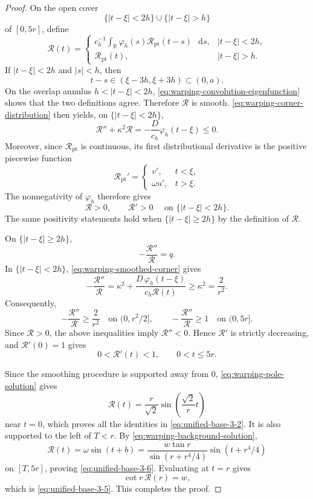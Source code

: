 \documentclass[11pt,reqno]{amsart}
\theoremstyle{definition}
\numberwithin{equation}{section}
\newcommand{\dd}{\mathop{}\!\mathrm d}
\begin{document}
\begin{proof}
On the open cover
\[
 \{|t-\xi|<2h\}\cup\{|t-\xi|>h\}
\]
of \([0,5r]\), define
\[
 \mathcal R(t)=
 \begin{cases}
 c_h^{-1}\displaystyle\int_{\mathbb R}
       \varphi_h(s)\mathcal R_{\mathrm{pt}}(t-s)\,\dd s,
       &|t-\xi|<2h,\\[2mm]
 \mathcal R_{\mathrm{pt}}(t),&|t-\xi|>h.
 \end{cases}
\]
If \(|t-\xi|<2h\) and \(|s|<h\), then
\[
 t-s\in(\xi-3h,\xi+3h)\subset(0,a).
\]
On the overlap annulus
\(h<|t-\xi|<2h\), \eqref{eq:warping-convolution-eigenfunction} shows that the two
definitions agree.  Therefore \(\mathcal R\) is smooth.
\eqref{eq:warping-corner-distribution} then yields, on $ \{|t-\xi|<2h\}$,
\begin{equation}
 \mathcal R''+\kappa^2\mathcal R
 =-\frac{D}{c_h}\varphi_h(t-\xi)\le0.
 \label{eq:warping-smoothed-corner}
\end{equation}
Moreover, since \(\mathcal R_{\mathrm{pt}}\) is continuous, its first
distributional derivative is the positive piecewise
function
\[
 \mathcal R_{\mathrm{pt}}'
 =
 \begin{cases}
  v',&t<\xi,\\
  \omega u',&t>\xi.
 \end{cases}
\]
The nonnegativity of \(\varphi_h\) therefore gives
\[
 \mathcal R>0,\qquad \mathcal R'>0
 \quad\text{ on } \{|t-\xi|<2h\}.
\]
The same positivity statements hold when
$\{|t-\xi|\geq 2h\}$ by the definition of $\mathcal R$.

On $ \{|t-\xi|\geq 2h\}$, 
\[
 -\frac{\mathcal R''}{\mathcal R}=q.
\]
In $ \{|t-\xi|<2h\}$, \eqref{eq:warping-smoothed-corner} gives
\[
 -\frac{\mathcal R''}{\mathcal R}
 =\kappa^2+
   \frac{D\,\varphi_h(t-\xi)}{c_h\mathcal R(t)}
 \ge\kappa^2=\frac2{r^2}.
\]
Consequently,
\[
 -\frac{\mathcal R''}{\mathcal R}\ge\frac2{r^2}
 \quad\text{on }(0,r^2/2],
 \qquad
 -\frac{\mathcal R''}{\mathcal R}\ge1
 \quad\text{on }(0,5r].
\]
Since \(\mathcal R>0\), the above inequalities imply
\(\mathcal R''<0\).  Hence \(\mathcal R'\) is strictly decreasing, and
\(\mathcal R'(0)=1\) gives
\[
 0<\mathcal R'(t)<1,\qquad0<t\le5r.
\]

Since the smoothing procedure is supported away from \(0\),
\eqref{eq:warping-pole-solution} gives
\[
 \mathcal R(t)=\frac r{\sqrt2}
 \sin\left(\frac{\sqrt2}{r}t\right)
\]
near \(t=0\), which proves all the identities in
\eqref{eq:unified-base-3-2}.  It is also supported to the left of
\(T<r\).  By \eqref{eq:warping-background-solution},
\[
 \mathcal R(t)
 =\omega\sin(t+b)
 =\frac{w\tan r}{\sin(r+r^4/4)}
   \sin(t+r^4/4)
\]
on \([T,5r]\), proving \eqref{eq:unified-base-3-6}.  Evaluating at
\(t=r\) gives
\[
 \cot r\,\mathcal R(r)=w,
\]
which is \eqref{eq:unified-base-3-5}.  This completes the proof.
\end{proof}
\end{document}

